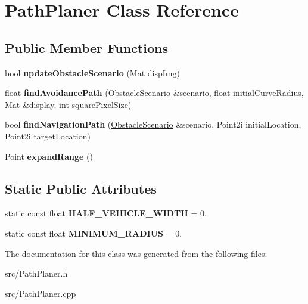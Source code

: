 \hypertarget{class_path_planer}{}\section{Path\+Planer Class Reference}
\label{class_path_planer}
\subsection*{Public Member Functions}
\begin{DoxyCompactItemize}
\item 
bool {\bfseries update\+Obstacle\+Scenario} (Mat disp\+Img)\hypertarget{class_path_planer_a2f934f5507b9721183e3445b1ce9dd69}{}\label{class_path_planer_a2f934f5507b9721183e3445b1ce9dd69}

\item 
float {\bfseries find\+Avoidance\+Path} (\hyperlink{class_obstacle_scenario}{Obstacle\+Scenario} \&scenario, float initial\+Curve\+Radius, Mat \&display, int square\+Pixel\+Size)\hypertarget{class_path_planer_a3b5c8d63a9bdf25a7c89bb549d7661de}{}\label{class_path_planer_a3b5c8d63a9bdf25a7c89bb549d7661de}

\item 
bool {\bfseries find\+Navigation\+Path} (\hyperlink{class_obstacle_scenario}{Obstacle\+Scenario} \&scenario, Point2i initial\+Location, Point2i target\+Location)\hypertarget{class_path_planer_ad421de46477e04b13c04412ff9da7d78}{}\label{class_path_planer_ad421de46477e04b13c04412ff9da7d78}

\item 
Point {\bfseries expand\+Range} ()\hypertarget{class_path_planer_ae412f314c4279ebebfb3420185a1af60}{}\label{class_path_planer_ae412f314c4279ebebfb3420185a1af60}

\end{DoxyCompactItemize}
\subsection*{Static Public Attributes}
\begin{DoxyCompactItemize}
\item 
static const float {\bfseries H\+A\+L\+F\+\_\+\+V\+E\+H\+I\+C\+L\+E\+\_\+\+W\+I\+D\+TH} = 0.\hypertarget{class_path_planer_a09dbd100be50cb13d3a659a5bfb383ef}{}\label{class_path_planer_a09dbd100be50cb13d3a659a5bfb383ef}

\item 
static const float {\bfseries M\+I\+N\+I\+M\+U\+M\+\_\+\+R\+A\+D\+I\+US} = 0.\hypertarget{class_path_planer_a080496592e985437e55b138280f8fbbe}{}\label{class_path_planer_a080496592e985437e55b138280f8fbbe}

\end{DoxyCompactItemize}


The documentation for this class was generated from the following files\+:\begin{DoxyCompactItemize}
\item 
src/Path\+Planer.\+h\item 
src/Path\+Planer.\+cpp\end{DoxyCompactItemize}
